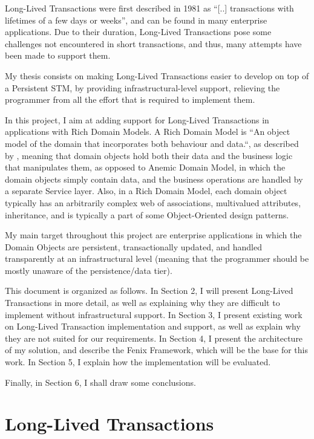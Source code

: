 \documentclass{llncs}
\begin{document}
Long-Lived Transactions were first described in 1981 as ``[..]
transactions with lifetimes of a few days or
weeks''\cite{gray1981transaction}, and can be found in many enterprise
applications. Due to their duration, Long-Lived Transactions pose some
challenges not encountered in short transactions, and thus, many
attempts have been made to support them.

My thesis consists on making Long-Lived Transactions easier to develop
on top of a Persistent STM, by providing infrastructural-level
support, relieving the programmer from all the effort that is required
to implement them.

In this project, I aim at adding support for Long-Lived Transactions
in applications with Rich Domain Models.  A Rich Domain Model is ``An
object model of the domain that incorporates both behaviour and
data.``, as described by \cite{fowler2003patterns}, meaning that
domain objects hold both their data and the business logic that
manipulates them, as opposed to Anemic Domain Model, in which the
domain objects simply contain data, and the business operations are
handled by a separate Service layer. Also, in a Rich Domain Model,
each domain object typically has an arbitrarily complex web of
associations, multivalued attributes, inheritance, and is typically a
part of some Object-Oriented design patterns.

My main target throughout this project are enterprise applications in
which the Domain Objects are persistent, transactionally updated, and
handled transparently at an infrastructural level (meaning that the
programmer should be mostly unaware of the persistence/data tier).

This document is organized as follows. In Section 2, I will present
Long-Lived Transactions in more detail, as well as explaining why they
are difficult to implement without infrastructural support. In Section
3, I present existing work on Long-Lived Transaction implementation
and support, as well as explain why they are not suited for our
requirements. In Section 4, I present the architecture of my solution,
and describe the Fenix Framework, which will be the base for this
work. In Section 5, I explain how the implementation will be
evaluated. 

Finally, in Section 6, I shall draw some conclusions.

\section{Long-Lived Transactions}
\end{document}
